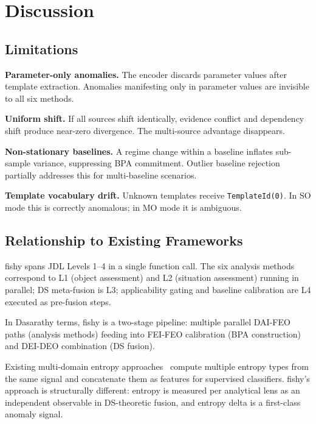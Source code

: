 \documentclass[10pt,twocolumn]{article}
\begin{document}
\section{Discussion}

\subsection{Limitations}

\textbf{Parameter-only anomalies.} The encoder discards parameter values after template extraction. Anomalies manifesting only in parameter values are invisible to all six methods.

\textbf{Uniform shift.} If all sources shift identically, evidence conflict and dependency shift produce near-zero divergence. The multi-source advantage disappears.

\textbf{Non-stationary baselines.} A regime change within a baseline inflates sub-sample variance, suppressing BPA commitment. Outlier baseline rejection partially addresses this for multi-baseline scenarios.

\textbf{Template vocabulary drift.} Unknown templates receive \texttt{TemplateId(0)}. In SO mode this is correctly anomalous; in MO mode it is ambiguous.

\subsection{Relationship to Existing Frameworks}

fishy spans JDL Levels 1--4 in a single function call. The six analysis methods correspond to L1 (object assessment) and L2 (situation assessment) running in parallel; DS meta-fusion is L3; applicability gating and baseline calibration are L4 executed as pre-fusion steps.

In Dasarathy terms, fishy is a two-stage pipeline: multiple parallel DAI-FEO paths (analysis methods) feeding into FEI-FEO calibration (BPA construction) and DEI-DEO combination (DS fusion).

Existing multi-domain entropy approaches~\cite{mde} compute multiple entropy types from the same signal and concatenate them as features for supervised classifiers. fishy's approach is structurally different: entropy is measured per analytical lens as an independent observable in DS-theoretic fusion, and entropy delta is a first-class anomaly signal.

\end{document}

